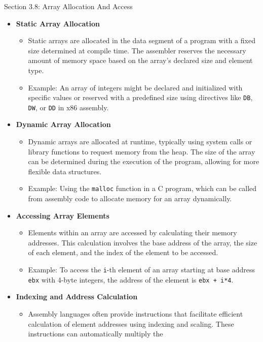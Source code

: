 \begin{notes}{Section 3.8: Array Allocation And Access}
    \begin{itemize}
        \item \textbf{Static Array Allocation}
        \begin{itemize}
            \item Static arrays are allocated in the data segment of a program with a fixed size determined at compile time. The assembler reserves the necessary amount of memory space based on the 
            array's declared size and element type.
            \item Example: An array of integers might be declared and initialized with specific values or reserved with a predefined size using directives like \texttt{DB}, \texttt{DW}, or \texttt{DD} 
            in x86 assembly.
        \end{itemize}
        \item \textbf{Dynamic Array Allocation}
        \begin{itemize}
            \item Dynamic arrays are allocated at runtime, typically using system calls or library functions to request memory from the heap. The size of the array can be determined during the execution 
            of the program, allowing for more flexible data structures.
            \item Example: Using the \texttt{malloc} function in a C program, which can be called from assembly code to allocate memory for an array dynamically.
        \end{itemize}
        \item \textbf{Accessing Array Elements}
        \begin{itemize}
            \item Elements within an array are accessed by calculating their memory addresses. This calculation involves the base address of the array, the size of each element, and the index of the 
            element to be accessed.
            \item Example: To access the \texttt{i}-th element of an array starting at base address \texttt{ebx} with 4-byte integers, the address of the element is \texttt{ebx + i*4}.
        \end{itemize}
        \item \textbf{Indexing and Address Calculation}
        \begin{itemize}
            \item Assembly languages often provide instructions that facilitate efficient calculation of element addresses using indexing and scaling. These instructions can automatically multiply the 

\end{itemize}
\end{itemize}
\end{notes}
